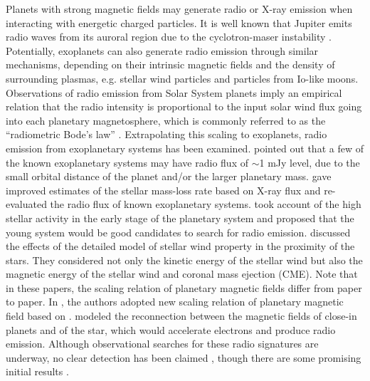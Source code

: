 \documentclass[iop,numberedappendix,apj]{emulateapj}
\def\memoYF#1{\color{red}$[${\bf #1}$]$ \color{black}}
\begin{document}
Planets with strong magnetic fields may generate radio or X-ray emission when interacting with energetic charged particles. 
It is well known that Jupiter emits radio waves from its auroral region due to the cyclotron-maser instability \citep{zarka1998}.  %
Potentially, exoplanets can also generate radio emission through similar mechanisms, depending on their intrinsic magnetic fields and the density of surrounding plasmas, e.g. stellar wind particles and particles from Io-like moons. 
Observations of radio emission from Solar System planets imply an empirical relation that the radio intensity is proportional to the input solar wind flux going into each planetary magnetosphere, which is commonly referred to as the ``radiometric Bode's law'' \citep{desch+kaiser1984}. 
Extrapolating this scaling to exoplanets, radio emission from exoplanetary systems has been examined. 
\citet{farrell1999,zarka2001,lazio2004} pointed out that a few of the known exoplanetary systems may have radio flux of $\sim $1 mJy level, due to the small orbital distance of the planet and/or the larger planetary mass. 
\citet{stevens2005} gave improved estimates of the stellar mass-loss rate based on X-ray flux and re-evaluated the radio flux of known exoplanetary systems. 
\citet{griesmeier2005} took account of the high stellar activity in the early stage of the planetary system and proposed that the young system would be good candidates to search for radio emission. 
\citet{griesmeier2007a, griesmeier2007b} discussed the effects of the detailed model of stellar wind property in the proximity of the stars. They considered not only the kinetic energy of the stellar wind but also the magnetic energy of the stellar wind and coronal mass ejection (CME). 
Note that in these papers, the scaling relation of planetary magnetic fields  differ from paper to paper.    
In \citet{reiners2010}, the authors adopted new scaling relation of planetary magnetic field based on \citet{christensen_et_al2009}.
\citet{jardine2008} modeled the reconnection between the magnetic fields of close-in planets and of the star, which would accelerate electrons and produce radio emission.  
Although observational searches for these radio signatures are underway, no clear detection has been claimed \citep{bastian2000,george2007,stroe2012,hallinan2013,murphy2015}, 
though there are some promising initial results \citep{lecavelier_et_al2013,sirothia2014}. 
\end{document}
